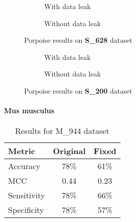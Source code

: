        \begin{figure}[H]
            \centering
            \begin{subfigure}{0.47\textwidth}
              \centering
              \resizebox{\textwidth}{!}{}
              \captionsetup{justification=centering}
              \caption{With data leak}
            \end{subfigure}%
            \hspace{0.05\textwidth}
            \begin{subfigure}{0.47\textwidth}
              \centering
              \resizebox{\textwidth}{!}{}
              \captionsetup{justification=centering}
              \caption{Without data leak}
            \end{subfigure}
            \caption{Porpoise results on \textbf{S\_628} dataset}\label{fig:porpoise_s628}
        \end{figure}

        \begin{figure}[H]
            \centering
            \begin{subfigure}{0.45\textwidth}
              \centering
              \resizebox{\textwidth}{!}{}
              \captionsetup{justification=centering}
              \caption{With data leak}
            \end{subfigure}%
            \hspace{0.05\textwidth}
            \begin{subfigure}{0.45\textwidth}
              \centering
              \resizebox{\textwidth}{!}{}
              \captionsetup{justification=centering}
              \caption{Without data leak}
            \end{subfigure}
            \caption{Porpoise results on \textbf{S\_200} dataset}\label{fig:porpoise_s200}
        \end{figure}

      \paragraph{Mus musculus}
        \noindent
        \begin{table}[H]
            \centering
            \begin{tabular}{lcc}
              \toprule
              \textbf{Metric} & \textbf{Original} & \textbf{Fixed} \\
              \midrule
              Accuracy        & 78\%              & 61\%           \\
              MCC             & 0.44              & 0.23           \\
              Sensitivity     & 78\%              & 66\%           \\
              Specificity     & 78\%              & 57\%           \\
              \bottomrule
            \end{tabular}
            \caption{Results for M\_944 dataset}
            \label{tab:porpoise_pstnpss_mm}
        \end{table}

